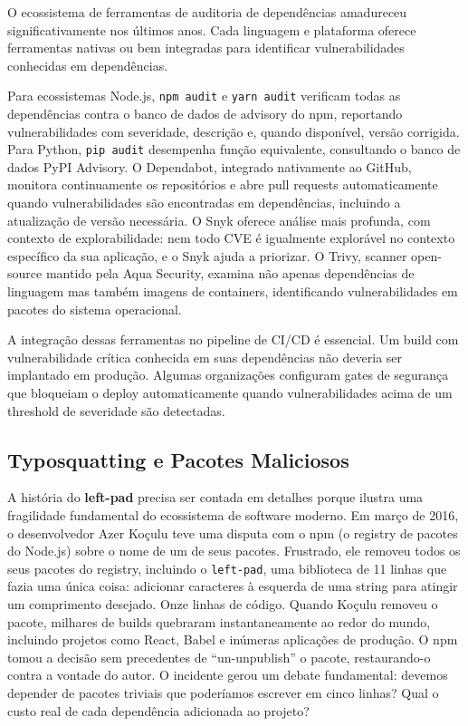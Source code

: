 O ecossistema de ferramentas de auditoria de dependências amadureceu
significativamente nos últimos anos. Cada linguagem e plataforma oferece
ferramentas nativas ou bem integradas para identificar vulnerabilidades
conhecidas em dependências.

Para ecossistemas Node.js, \texttt{npm audit} e \texttt{yarn audit} verificam
todas as dependências contra o banco de dados de advisory do npm, reportando
vulnerabilidades com severidade, descrição e, quando disponível, versão corrigida.
Para Python, \texttt{pip audit} desempenha função equivalente, consultando o
banco de dados PyPI Advisory. O Dependabot, integrado nativamente ao GitHub,
monitora continuamente os repositórios e abre pull requests automaticamente
quando vulnerabilidades são encontradas em dependências, incluindo a atualização
de versão necessária. O Snyk oferece análise mais profunda, com contexto de
explorabilidade: nem todo CVE é igualmente explorável no contexto específico
da sua aplicação, e o Snyk ajuda a priorizar. O Trivy, scanner open-source
mantido pela Aqua Security, examina não apenas dependências de linguagem mas
também imagens de containers, identificando vulnerabilidades em pacotes do
sistema operacional.

A integração dessas ferramentas no pipeline de CI/CD é essencial. Um build
com vulnerabilidade crítica conhecida em suas dependências não deveria ser
implantado em produção. Algumas organizações configuram gates de segurança
que bloqueiam o deploy automaticamente quando vulnerabilidades acima de um
threshold de severidade são detectadas.

\subsection{Typosquatting e Pacotes Maliciosos}

A história do \textbf{left-pad} precisa ser contada em detalhes porque ilustra
uma fragilidade fundamental do ecossistema de software moderno. Em março de 2016,
o desenvolvedor Azer Koçulu teve uma disputa com o npm (o registry de pacotes do
Node.js) sobre o nome de um de seus pacotes. Frustrado, ele removeu todos os seus
pacotes do registry, incluindo o \texttt{left-pad}, uma biblioteca de 11 linhas
que fazia uma única coisa: adicionar caracteres à esquerda de uma string para
atingir um comprimento desejado. Onze linhas de código. Quando Koçulu removeu o
pacote, milhares de builds quebraram instantaneamente ao redor do mundo, incluindo
projetos como React, Babel e inúmeras aplicações de produção. O npm tomou a
decisão sem precedentes de ``un-unpublish'' o pacote, restaurando-o contra a
vontade do autor. O incidente gerou um debate fundamental: devemos depender de
pacotes triviais que poderíamos escrever em cinco linhas? Qual o custo real de
cada dependência adicionada ao projeto?

